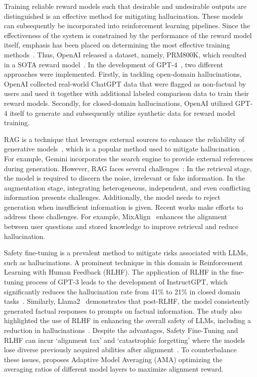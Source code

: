 Training reliable reward models such that desirable and undesirable outputs are distinguished is an effective method for mitigating hallucination. These models can subsequently be incorporated into reinforcement learning pipelines. Since the effectiveness of the system is constrained by the performance of the reward model itself, emphasis has been placed on determining the most effective training methods~. Thus, OpenAI released a dataset, namely, PRM800K, which resulted in a SOTA reward model~. In the development of GPT-4~, two different approaches were implemented. Firstly, in tackling open-domain hallucinations, OpenAI collected real-world ChatGPT data that were flagged as non-factual by users and used it together with additional labeled comparison data to train their reward models. Secondly, for closed-domain hallucinations, OpenAI utilized GPT-4 itself to generate and subsequently utilize synthetic data for reward model training.

RAG is a technique that leverages external sources to enhance the reliability of generative models~, which is a popular method used to mitigate hallucination~. For example, Gemini incorporates the search engine to provide external references during generation. 
However, RAG faces several challenges~: 
In the retrieval stage, the model is required to discern the noise, irrelevant or fake information. 
In the augmentation stage, integrating heterogeneous, independent, and even conflicting information presents challenges. 
Additionally, the model needs to reject generation when insufficient information is given.
Recent works make efforts to address these challenges.
For example, MixAlign~ enhances the alignment between user questions and stored knowledge to improve retrieval and reduce hallucination.



Safety fine-tuning is a prevalent method to mitigate risks associated with LLMs, such as hallucinations. A prominent technique in this domain is Reinforcement Learning with Human Feedback (RLHF).
The application of RLHF in the fine-tuning process of GPT-3 leads to the development of InstructGPT, which significantly reduces the hallucination rate from 41\% to 21\% in closed domain tasks~.
Similarly, Llama2~ demonstrates that post-RLHF, the model consistently generated factual responses to prompts on factual information. The study also highlighted the use of RLHF in enhancing the overall safety of LLMs, including a reduction in hallucinations~.
Despite the advantages, Safety Fine-Tuning and RLHF can incur `alignment tax' and `catastrophic forgetting' where the models lose diverse previously acquired abilities after alignment~. To counterbalance these issues,  proposes Adaptive Model Averaging (AMA) optimizing the averaging ratios of different model layers to maximize alignment reward.

